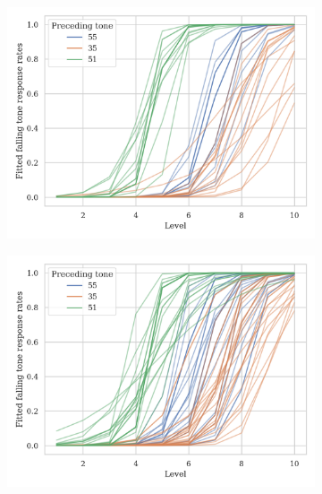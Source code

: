 \documentclass[12pt]{report}
\begin{document}
\begin{CJK}{UTF8}{bsmi}
\begin{figure}[hbt!]
\centering
\begin{subfigure}[b]{.45\textwidth}
\centering
\includegraphics[width=\textwidth]{Figures/E2/Mandarin_monolingual_E2_raw.png}
\end{subfigure}
\hfill
\begin{subfigure}[b]{.45\textwidth}
\centering
\includegraphics[width=\textwidth]{Figures/E2/Mandarin_bilingual_E2_raw.png}
\end{subfigure}
\hfill
\begin{subfigure}[b]{.45\textwidth}
\centering

\end{subfigure}
\end{figure}
\end{CJK}
\end{document}
